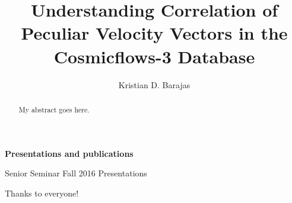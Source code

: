 \documentclass[12pt]{report}
\begin{document}
\title{Understanding Correlation of Peculiar Velocity Vectors in the Cosmicflows-3 Database}
\author{Kristian D. Barajas}

\maketitle


\newpage

\begin{center}
\textbf{Presentations and publications}
\item{Senior Seminar Fall 2016 Presentations}
\end{center}



\begin{acknowledgments}
Thanks to everyone!
\end{acknowledgments}

\begin{abstract}
My abstract goes here.
\end{abstract}

\tableofcontents
\listoftables
\listoffigures












\nocite{*}
%



\appendix
%
\end{document}
